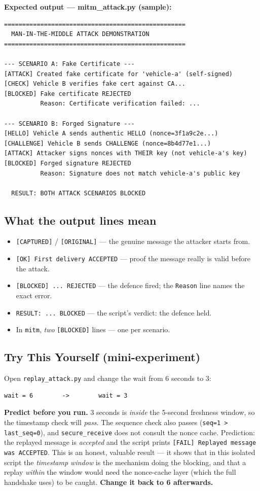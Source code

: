 \documentclass[11pt,a4paper]{report}
\begin{document}
\noindent\textbf{Expected output --- mitm\_attack.py (sample):}
\begin{lstlisting}[style=term]
==================================================
  MAN-IN-THE-MIDDLE ATTACK DEMONSTRATION
==================================================

--- SCENARIO A: Fake Certificate ---
[ATTACK] Created fake certificate for 'vehicle-a' (self-signed)
[CHECK] Vehicle B verifies fake cert against CA...
[BLOCKED] Fake certificate REJECTED
          Reason: Certificate verification failed: ...

--- SCENARIO B: Forged Signature ---
[HELLO] Vehicle A sends authentic HELLO (nonce=3f1a9c2e...)
[CHALLENGE] Vehicle B sends CHALLENGE (nonce=8b4d77e1...)
[ATTACK] Attacker signs nonces with THEIR key (not vehicle-a's key)
[BLOCKED] Forged signature REJECTED
          Reason: Signature does not match vehicle-a's public key

  RESULT: BOTH ATTACK SCENARIOS BLOCKED
\end{lstlisting}

\subsection{What the output lines mean}
\begin{itemize}
  \item \texttt{[CAPTURED]} / \texttt{[ORIGINAL]} --- the genuine message the
        attacker starts from.
  \item \texttt{[OK] First delivery ACCEPTED} --- proof the message really is
        valid before the attack.
  \item \texttt{[BLOCKED] ... REJECTED} --- the defence fired; the
        \texttt{Reason} line names the exact error.
  \item \texttt{RESULT: ... BLOCKED} --- the script's verdict: the defence held.
  \item In \texttt{mitm}, \emph{two} \texttt{[BLOCKED]} lines --- one per scenario.
\end{itemize}

\subsection{Try This Yourself (mini-experiment)}
Open \texttt{replay\_attack.py} and change the wait from 6 seconds to 3:
\begin{lstlisting}[style=term]
wait = 6        ->        wait = 3
\end{lstlisting}
\textbf{Predict before you run.} 3 seconds is \emph{inside} the 5-second freshness
window, so the timestamp check will \emph{pass}. The sequence check also passes
(\texttt{seq=1 > last\_seq=0}), and \texttt{secure\_receive} does not consult the
nonce cache. Prediction: the replayed message is \emph{accepted} and the script
prints \texttt{[FAIL] Replayed message was ACCEPTED}. This is an honest, valuable
result --- it shows that in this isolated script the \emph{timestamp window} is
the mechanism doing the blocking, and that a replay \emph{within} the window
would need the nonce-cache layer (which the full handshake uses) to be caught.
\textbf{Change it back to 6 afterwards.}
\end{document}
